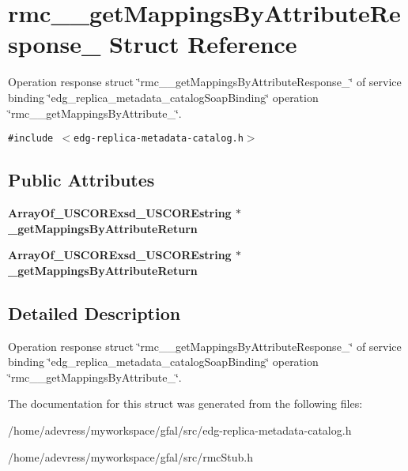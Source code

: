 \section{rmc\_\-\_\-get\-Mappings\-By\-Attribute\-Response\_\- Struct Reference}
\label{structrmc____getMappingsByAttributeResponse__}
Operation response struct \char`\"{}rmc\_\-\_\-get\-Mappings\-By\-Attribute\-Response\_\-\char`\"{} of service binding \char`\"{}edg\_\-replica\_\-metadata\_\-catalog\-Soap\-Binding\char`\"{} operation \char`\"{}rmc\_\-\_\-get\-Mappings\-By\-Attribute\_\-\char`\"{}.  


{\tt \#include $<$edg-replica-metadata-catalog.h$>$}

\subsection*{Public Attributes}
\begin{CompactItemize}
\item 
\bf{Array\-Of\_\-USCORExsd\_\-USCOREstring} $\ast$ \textbf{\_\-get\-Mappings\-By\-Attribute\-Return}\label{structrmc____getMappingsByAttributeResponse___d25dca6060440a4bd7f28e2069b996df}

\item 
\bf{Array\-Of\_\-USCORExsd\_\-USCOREstring} $\ast$ \textbf{\_\-get\-Mappings\-By\-Attribute\-Return}\label{structrmc____getMappingsByAttributeResponse___d25dca6060440a4bd7f28e2069b996df}

\end{CompactItemize}


\subsection{Detailed Description}
Operation response struct \char`\"{}rmc\_\-\_\-get\-Mappings\-By\-Attribute\-Response\_\-\char`\"{} of service binding \char`\"{}edg\_\-replica\_\-metadata\_\-catalog\-Soap\-Binding\char`\"{} operation \char`\"{}rmc\_\-\_\-get\-Mappings\-By\-Attribute\_\-\char`\"{}. 



The documentation for this struct was generated from the following files:\begin{CompactItemize}
\item 
/home/adevress/myworkspace/gfal/src/edg-replica-metadata-catalog.h\item 
/home/adevress/myworkspace/gfal/src/rmc\-Stub.h\end{CompactItemize}
